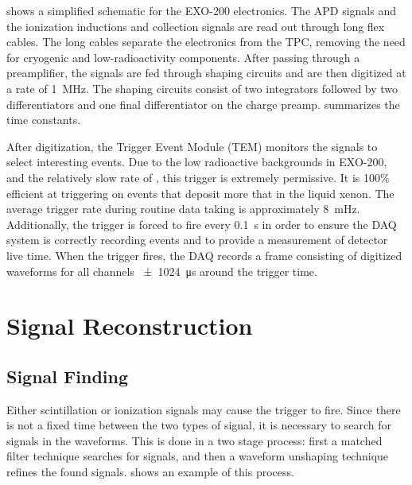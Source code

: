 \documentclass[herrin-thesis.tex]{subfiles}
\begin{document}
 shows a simplified schematic for the EXO-200 electronics. The APD signals and the ionization inductions and collection signals are read out through long flex cables. The long cables separate the electronics from the TPC, removing the need for cryogenic and low-radioactivity components. After passing through a preamplifier, the signals are fed through shaping circuits and are then digitized at a rate of \SI{1}{\MHz}. The shaping circuits consist of two integrators followed by two differentiators and one final differentiator on the charge preamp.  summarizes the time constants.

After digitization, the Trigger Event Module (TEM) monitors the signals to select interesting events. Due to the low radioactive backgrounds in EXO-200, and the relatively slow rate of \twonu, this trigger is extremely permissive. It is 100\% efficient at triggering on events that deposit more that  in the liquid xenon. The average trigger rate during routine data taking is approximately \SI{8}{\mHz}. Additionally, the trigger is forced to fire every \SI{0.1}{\s} in order to ensure the DAQ system is correctly recording events and to provide a measurement of detector live time. When the trigger fires, the DAQ records a frame consisting of digitized waveforms for all channels \SI{\pm1024}{\micro\s} around the trigger time.

\section{Signal Reconstruction}
\subsection{Signal Finding}
Either scintillation or ionization signals may cause the trigger to fire. Since there is not a fixed time between the two types of signal, it is necessary to search for signals in the waveforms. This is done in a two stage process: first a matched filter technique searches for signals, and then a waveform unshaping technique refines the found signals.  shows an example of this process.
\end{document}
